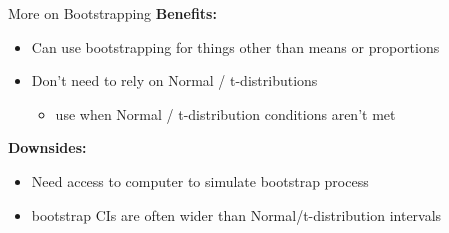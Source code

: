 \documentclass{beamer}
\begin{document}
\begin{frame}{More on Bootstrapping}
\textbf{Benefits:}
\begin{itemize}
    \item Can use bootstrapping for things other than means or proportions
    \item Don't need to rely on Normal / t-distributions
    \begin{itemize}
        \item use when Normal / t-distribution conditions aren't met
    \end{itemize}
\end{itemize} \vspace{8mm}

\textbf{Downsides:}
\begin{itemize}
    \item Need access to computer to simulate bootstrap process
    \item bootstrap CIs are often wider than Normal/t-distribution intervals
\end{itemize}

\end{frame}


%
%
\end{document}
